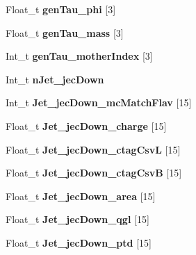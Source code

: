 \begin{DoxyCompactItemize}
\hypertarget{classMiniTree_aabc73db04c2504690f6daa18b57a48f0}{}\label{classMiniTree_aabc73db04c2504690f6daa18b57a48f0} 
Float\+\_\+t {\bfseries gen\+Tau\+\_\+phi} \mbox{[}3\mbox{]}
\item 
\hypertarget{classMiniTree_af92c46cdd210c4a625dc1a77f6f44b58}{}\label{classMiniTree_af92c46cdd210c4a625dc1a77f6f44b58} 
Float\+\_\+t {\bfseries gen\+Tau\+\_\+mass} \mbox{[}3\mbox{]}
\item 
\hypertarget{classMiniTree_af210c5948414a42412dc177557c727dd}{}\label{classMiniTree_af210c5948414a42412dc177557c727dd} 
Int\+\_\+t {\bfseries gen\+Tau\+\_\+mother\+Index} \mbox{[}3\mbox{]}
\item 
\hypertarget{classMiniTree_a363124fcfdfa92aece39caee43b2fdd1}{}\label{classMiniTree_a363124fcfdfa92aece39caee43b2fdd1} 
Int\+\_\+t {\bfseries n\+Jet\+\_\+jec\+Down}
\item 
\hypertarget{classMiniTree_a48460be002906953ca942c9c9c548215}{}\label{classMiniTree_a48460be002906953ca942c9c9c548215} 
Int\+\_\+t {\bfseries Jet\+\_\+jec\+Down\+\_\+mc\+Match\+Flav} \mbox{[}15\mbox{]}
\item 
\hypertarget{classMiniTree_a76c6ef29d6a5894ee69297aa1e5fe793}{}\label{classMiniTree_a76c6ef29d6a5894ee69297aa1e5fe793} 
Float\+\_\+t {\bfseries Jet\+\_\+jec\+Down\+\_\+charge} \mbox{[}15\mbox{]}
\item 
\hypertarget{classMiniTree_ab1b8bc89a9e543138701ab3859133386}{}\label{classMiniTree_ab1b8bc89a9e543138701ab3859133386} 
Float\+\_\+t {\bfseries Jet\+\_\+jec\+Down\+\_\+ctag\+CsvL} \mbox{[}15\mbox{]}
\item 
\hypertarget{classMiniTree_a1ed791dc999b33b6afe3a20368a4eef1}{}\label{classMiniTree_a1ed791dc999b33b6afe3a20368a4eef1} 
Float\+\_\+t {\bfseries Jet\+\_\+jec\+Down\+\_\+ctag\+CsvB} \mbox{[}15\mbox{]}
\item 
\hypertarget{classMiniTree_a8dad65c618401b8fe95b4ac69c05d93e}{}\label{classMiniTree_a8dad65c618401b8fe95b4ac69c05d93e} 
Float\+\_\+t {\bfseries Jet\+\_\+jec\+Down\+\_\+area} \mbox{[}15\mbox{]}
\item 
\hypertarget{classMiniTree_aee31f677f4cc4d8f2bb891a0743a42e3}{}\label{classMiniTree_aee31f677f4cc4d8f2bb891a0743a42e3} 
Float\+\_\+t {\bfseries Jet\+\_\+jec\+Down\+\_\+qgl} \mbox{[}15\mbox{]}
\item 
\hypertarget{classMiniTree_a1ccd20af08d78877215606c918161bdb}{}\label{classMiniTree_a1ccd20af08d78877215606c918161bdb} 
Float\+\_\+t {\bfseries Jet\+\_\+jec\+Down\+\_\+ptd} \mbox{[}15\mbox{]}
\item 

\end{DoxyCompactItemize}

